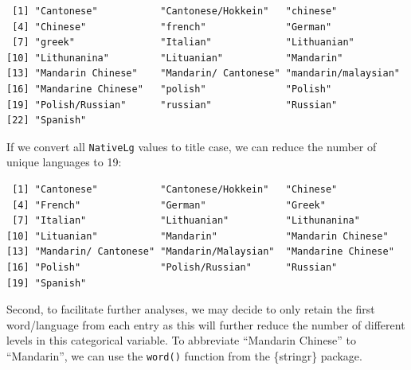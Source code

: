 \documentclass[
  letterpaper,
  DIV=11,
  numbers=noendperiod]{scrreprt}
\newenvironment{Shaded}{\begin{snugshade}}{\end{snugshade}}
\newcommand{\FunctionTok}[1]{\textcolor[rgb]{0.28,0.35,0.67}{#1}}
\newcommand{\NormalTok}[1]{\textcolor[rgb]{0.00,0.23,0.31}{#1}}
\newcommand{\SpecialCharTok}[1]{\textcolor[rgb]{0.37,0.37,0.37}{#1}}
\begin{document}
\begin{Shaded}
\end{Shaded}

\begin{verbatim}
 [1] "Cantonese"           "Cantonese/Hokkein"   "chinese"            
 [4] "Chinese"             "french"              "German"             
 [7] "greek"               "Italian"             "Lithuanian"         
[10] "Lithunanina"         "Lituanian"           "Mandarin"           
[13] "Mandarin Chinese"    "Mandarin/ Cantonese" "mandarin/malaysian" 
[16] "Mandarine Chinese"   "polish"              "Polish"             
[19] "Polish/Russian"      "russian"             "Russian"            
[22] "Spanish"            
\end{verbatim}

If we convert all \texttt{NativeLg} values to title case, we can reduce
the number of unique languages to 19:

\begin{Shaded}
\end{Shaded}

\begin{verbatim}
 [1] "Cantonese"           "Cantonese/Hokkein"   "Chinese"            
 [4] "French"              "German"              "Greek"              
 [7] "Italian"             "Lithuanian"          "Lithunanina"        
[10] "Lituanian"           "Mandarin"            "Mandarin Chinese"   
[13] "Mandarin/ Cantonese" "Mandarin/Malaysian"  "Mandarine Chinese"  
[16] "Polish"              "Polish/Russian"      "Russian"            
[19] "Spanish"            
\end{verbatim}

Second, to facilitate further analyses, we may decide to only retain the
first word/language from each entry as this will further reduce the
number of different levels in this categorical variable. To abbreviate
``Mandarin Chinese'' to ``Mandarin'', we can use the \texttt{word()}
function from the \{stringr\} package.
\end{document}
